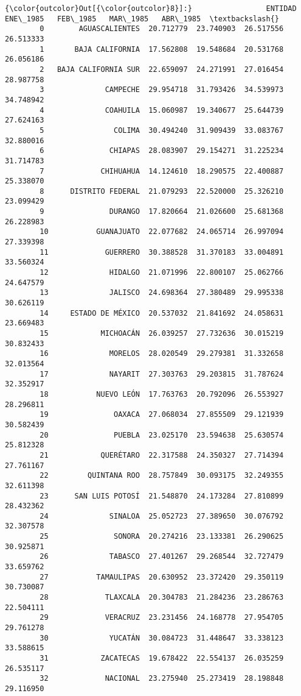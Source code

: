 \documentclass[11pt]{article}
\begin{document}
\begin{Verbatim}[commandchars=\\\{\}]
{\color{outcolor}Out[{\color{outcolor}8}]:}                 ENTIDAD   ENE\_1985   FEB\_1985   MAR\_1985   ABR\_1985  \textbackslash{}
        0        AGUASCALIENTES  20.712779  23.740903  26.517556  26.513333   
        1       BAJA CALIFORNIA  17.562808  19.548684  20.531768  26.056186   
        2   BAJA CALIFORNIA SUR  22.659097  24.271991  27.016454  28.987758   
        3              CAMPECHE  29.954718  31.793426  34.539973  34.748942   
        4              COAHUILA  15.060987  19.340677  25.644739  27.624163   
        5                COLIMA  30.494240  31.909439  33.083767  32.880016   
        6               CHIAPAS  28.083907  29.154271  31.225234  31.714783   
        7             CHIHUAHUA  14.124610  18.290575  22.400887  25.338070   
        8      DISTRITO FEDERAL  21.079293  22.520000  25.326210  23.099429   
        9               DURANGO  17.820664  21.026600  25.681368  26.228983   
        10           GUANAJUATO  22.077682  24.065714  26.997094  27.339398   
        11             GUERRERO  30.388528  31.370183  33.004891  33.560324   
        12              HIDALGO  21.071996  22.800107  25.062766  24.647579   
        13              JALISCO  24.698364  27.380489  29.995338  30.626119   
        14     ESTADO DE MÉXICO  20.537032  21.841692  24.058631  23.669483   
        15            MICHOACÁN  26.039257  27.732636  30.015219  30.832433   
        16              MORELOS  28.020549  29.279381  31.332658  32.013564   
        17              NAYARIT  27.303763  29.203815  31.787624  32.352917   
        18           NUEVO LEÓN  17.763763  20.792096  26.553927  28.296811   
        19               OAXACA  27.068034  27.855509  29.121939  30.582439   
        20               PUEBLA  23.025170  23.594638  25.630574  25.812328   
        21            QUERÉTARO  22.317588  24.350327  27.714394  27.761167   
        22         QUINTANA ROO  28.757849  30.093175  32.249355  32.611398   
        23      SAN LUIS POTOSÍ  21.548870  24.173284  27.810899  28.432362   
        24              SINALOA  25.052723  27.389650  30.076792  32.307578   
        25               SONORA  20.274216  23.133381  26.290625  30.925871   
        26              TABASCO  27.401267  29.268544  32.727479  33.659762   
        27           TAMAULIPAS  20.630952  23.372420  29.350119  30.730087   
        28             TLAXCALA  20.304783  21.284236  23.286763  22.504111   
        29             VERACRUZ  23.231456  24.168778  27.954705  29.761278   
        30              YUCATÁN  30.084723  31.448647  33.338123  33.588615   
        31            ZACATECAS  19.678422  22.554137  26.035259  26.535117   
        32             NACIONAL  23.275940  25.273419  28.198848  29.116950   
        

\end{Verbatim}
\end{document}
